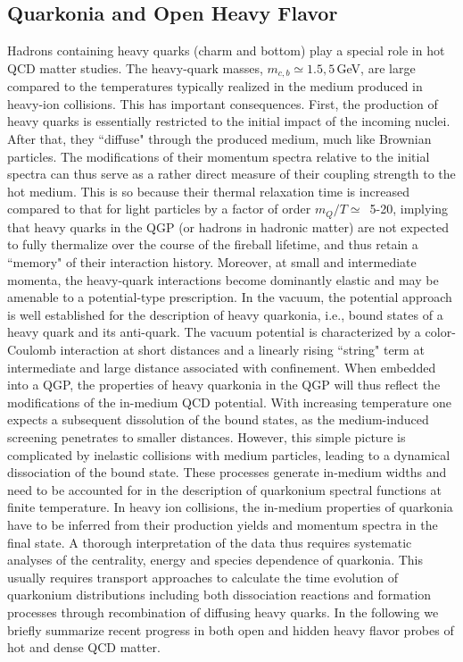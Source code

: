 \subsection{Quarkonia and Open Heavy Flavor}
\label{Sec:HF}
 Hadrons containing heavy quarks (charm and bottom) play a special role in hot QCD matter studies.
	The heavy-quark masses, $m_{c,b}\simeq1.5,5$\,GeV, are large compared to the temperatures typically
	realized in the medium produced in heavy-ion collisions. This has important consequences.
	First, the production of heavy quarks is essentially restricted to the initial impact of the
	incoming nuclei. After that, they ``diffuse" through the produced medium, much like Brownian
	particles. The modifications of their momentum spectra relative to the initial spectra can thus
	serve as a rather direct measure of their coupling strength to the hot medium. This is so because 
        their thermal relaxation time is increased compared to that for light particles by a factor of order 
        $m_Q/T\simeq$~5-20, implying that heavy quarks in the QGP (or hadrons in hadronic matter) are 
        not expected to fully thermalize over the course of the fireball lifetime, and thus retain a 
        ``memory" of their interaction history. Moreover, at small and intermediate momenta, the heavy-quark 
        interactions become dominantly elastic and may be amenable to a potential-type prescription. 
        In the vacuum, the potential approach is well established for the description of heavy quarkonia, 
        i.e., bound states of a heavy quark and its anti-quark. The vacuum potential is characterized 
        by a color-Coulomb interaction at short distances and a linearly rising ``string" term at 
        intermediate and large distance associated with confinement. When embedded into a QGP, the 
        properties of heavy quarkonia in the QGP will thus reflect the modifications of the in-medium
        QCD potential. With increasing temperature one expects a subsequent dissolution of the 
        bound states, as the medium-induced screening penetrates to smaller distances. However, this
        simple picture is complicated by inelastic collisions with medium particles, leading to 
        a dynamical dissociation of the bound state. These processes generate in-medium widths and
        need to be accounted for in the description of quarkonium spectral functions at finite
        temperature. In heavy ion collisions, the in-medium properties of quarkonia have to be inferred
        from their production yields and momentum spectra in the final state. A thorough interpretation
        of the data thus requires systematic analyses of the centrality, energy and species dependence
        of quarkonia. This usually requires transport approaches to calculate the time evolution of 
        quarkonium distributions including both dissociation reactions and formation processes
        through recombination of diffusing heavy quarks.   
     	In the following we briefly summarize recent progress in both open and hidden heavy flavor probes of
        hot and dense QCD matter.





